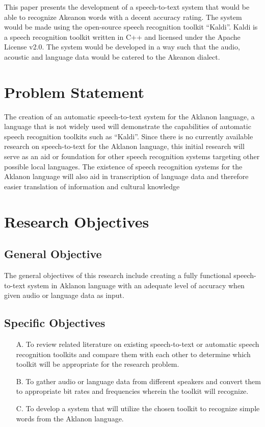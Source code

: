This paper presents the development of a speech-to-text system that would be able to recognize Akeanon words with a decent accuracy rating. The system would be made using the open-source speech recognition toolkit “Kaldi”. Kaldi is a speech recognition toolkit written in C++ and licensed under the Apache License v2.0. The system would be developed in a way such that the audio, acoustic and language data would be catered to the Akeanon dialect.


\section{Problem Statement}

The creation of an automatic speech-to-text system for the Aklanon language, a language that is not widely used will demonstrate the capabilities of automatic speech recognition toolkits such as “Kaldi”.  Since there is no currently available research on speech-to-text for the Aklanon language, this initial research will serve as an aid or foundation for other speech recognition systems targeting other possible local languages. The existence of speech recognition systems for the Aklanon language will also aid in transcription of language data and therefore easier translation of information and cultural knowledge

\section{Research Objectives}


\subsection{General Objective}

The general objectives of this research include creating a fully functional speech-to-text system in Aklanon language with an adequate level of accuracy when given audio or language data as input. 


\subsection{Specific Objectives}
\begin{itemize}
\item[A.] To review related literature on existing speech-to-text or automatic speech recognition toolkits and compare them with each other to determine which toolkit will be appropriate for the research problem. 

\item[B.] To gather audio or language data from different speakers and convert them to appropriate bit rates and frequencies wherein the toolkit will recognize. 

\item[C.] To develop a system that will utilize the chosen toolkit to recognize simple words from the Aklanon language.
\end{itemize}



